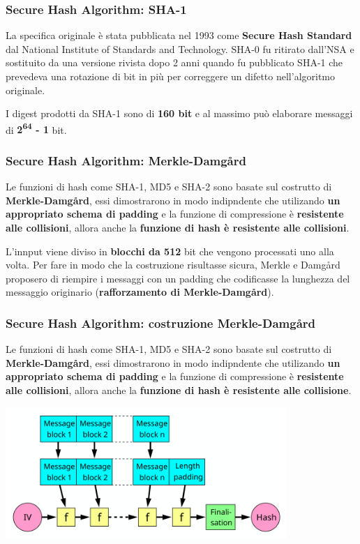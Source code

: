 \begin{frame}
	\frametitle{Secure Hash Algorithm: SHA-1}

	La specifica originale è stata pubblicata nel 1993 come \textbf{Secure Hash Standard} dal National Institute of Standards and Technology.
	SHA-0 fu ritirato dall'NSA e sostituito da una versione rivista dopo 2 anni quando fu pubblicato SHA-1 che prevedeva una rotazione di bit in più
	per correggere un difetto nell'algoritmo originale.

	\vspace{1cm}

	I digest prodotti da SHA-1 sono di \textbf{160 bit} e al massimo può elaborare messaggi di \textbf{2\textsuperscript{64} - 1} bit.
\end{frame}

\begin{frame}
	\frametitle{Secure Hash Algorithm: Merkle-Damgård}

	Le funzioni di hash come SHA-1, MD5 e SHA-2 sono basate sul costrutto di \textbf{Merkle-Damgård}, essi dimostrarono in modo indipndente
	che utilizando \textbf{un appropriato schema di padding} e la funzione di compressione è \textbf{resistente alle collisioni}, allora anche la \textbf{funzione di hash è resistente alle collisioni}.

	\vspace{1cm}

	L'innput viene diviso in \textbf{blocchi da 512} bit che vengono processati uno alla volta.
	Per fare in modo che la costruzione risultasse sicura, Merkle e Damgård proposero di
	riempire i messaggi con un padding che codificasse la lunghezza del messaggio originario (\textbf{rafforzamento di Merkle-Damgård}).

\end{frame}


\begin{frame}
	\frametitle{Secure Hash Algorithm: costruzione Merkle-Damgård}
	Le funzioni di hash come SHA-1, MD5 e SHA-2 sono basate sul costrutto di \textbf{Merkle-Damgård}, essi dimostrarono in modo indipndente
	che utilizando \textbf{un appropriato schema di padding} e la funzione di compressione è \textbf{resistente alle collisioni}, allora anche la \textbf{funzione di hash è resistente alle collisione}.

	\begin{center}
		\includegraphics[width=0.8\textwidth]{img/1-img/Merkle-Damgard.png}
	\end{center}
\end{frame}

